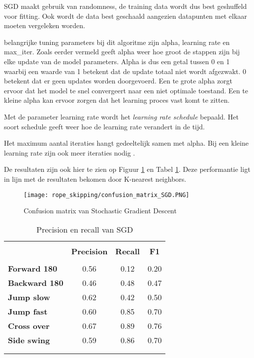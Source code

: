 SGD maakt gebruik van randomness, de training data wordt dus best geshuffeld voor fitting.
Ook wordt de data best geschaald aangezien datapunten met elkaar moeten vergeleken worden.

belangrijke tuning parameters bij dit algoritme zijn alpha, learning rate en max\_iter.
Zoals eerder vermeld geeft alpha weer hoe groot de stappen zijn bij elke update van de model parameters.
Alpha is dus een getal tussen 0 en 1 waarbij een waarde van 1 betekent dat de update totaal niet wordt afgezwakt. 0 betekent dat er geen updates worden doorgevoerd.
Een te grote alpha zorgt ervoor dat het model te snel convergeert naar een niet optimale toestand.
Een te kleine alpha kan ervoor zorgen dat het learning proces vast komt te zitten.

Met de parameter learning rate wordt het \textit{learning rate schedule} bepaald. Het soort schedule geeft weer hoe de learning rate verandert in de tijd.

Het maximum aantal iteraties hangt gedeeltelijk samen met alpha. Bij een kleine learning rate zijn ook meer iteraties nodig \cite{ref40} \cite{ref41} \cite{ref42}.

De resultaten zijn ook hier te zien op Figuur \ref{fig:SGD} en Tabel \ref{tab:SGD}. Deze performantie ligt in lijn met de resultaten bekomen door K-nearest neighbors.

\begin{figure}[!htpd]
\centering
\caption{Confusion matrix van Stochastic Gradient Descent}\label{fig:SGD}
\texttt{[image: rope\_skipping/confusion\_matrix\_SGD.PNG]}  
\end{figure}

\begin{table}[!htpd]
  \centering
  \caption{Precision en recall van SGD}
  \label{tab:SGD}
\begin{tabular}{lccc}
 \hline \\
\textbf{}             & \textbf{Precision} & \textbf{Recall} & \textbf{F1} &  \\
\hline \\
\textbf{Forward 180}  & 0.56               & 0.12            & 0.20        &  \\
\textbf{Backward 180} & 0.46               & 0.48            & 0.47        &  \\
\textbf{Jump slow}    & 0.62               & 0.42            & 0.50        &  \\
\textbf{Jump fast}    & 0.60               & 0.85            & 0.70        &  \\
\textbf{Cross over}   & 0.67               & 0.89            & 0.76        &  \\
\textbf{Side swing}   & 0.59               & 0.86            & 0.70        & \\\\
\hline \\
\end{tabular}
\end{table}

